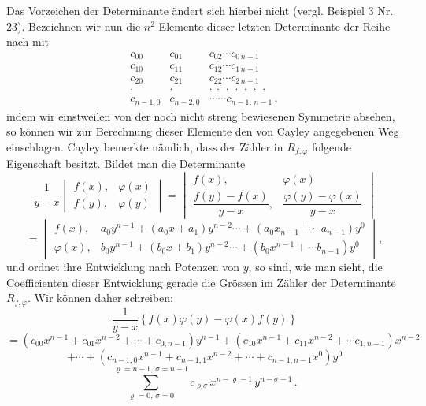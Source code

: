 \documentclass[11pt]{article}
\providecommand{\weq}[2]{\begin{equation}\tag{#1}#2\end{equation}}
\begin{document}
Das Vorzeichen der Determinante \"andert sich hierbei nicht (vergl.
Beispiel 3 Nr. 23). Bezeichnen wir nun die $n^2$ Elemente dieser letzten
Determinante der Reihe nach mit
\[
\begin{matrix}
c_{00} & c_{01} & c_{02} \cdots c_{0\,n-1} \\
c_{10} & c_{11} & c_{12} \cdots c_{1\,n-1} \\
c_{20} & c_{21} & c_{22} \cdots c_{2\,n-1} \\
\cdot & \cdot & \cdot\ \cdot\ \cdot\ \cdot\ \cdot\ \cdot\ \cdot \\
c_{n-1,0} & c_{n-2,0} & \cdots\cdots c_{n-1,\,n-1}\,,
\end{matrix}
\]
indem wir einstweilen von der noch nicht streng bewiesenen Symmetrie
absehen, so k\"onnen wir zur Berechnung dieser Elemente den von Cayley
angegebenen Weg einschlagen. Cayley bemerkte n\"amlich, dass der Z\"ahler
in $R_{f,\varphi}$ folgende Eigenschaft besitzt. Bildet man die
Determinante
\[
\frac{1}{y-x}
\begin{vmatrix} f(x), & \varphi(x) \\ f(y), & \varphi(y) \end{vmatrix}
=
\begin{vmatrix} f(x), & \varphi(x) \\[4pt]
\dfrac{f(y)-f(x)}{y-x}, & \dfrac{\varphi(y)-\varphi(x)}{y-x} \end{vmatrix}
\]
\[
=
\begin{vmatrix}
f(x), & a_0 y^{n-1} + (a_0 x + a_1) y^{n-2} \cdots + (a_0 x_{n-1} + \cdots a_{n-1}) y^0 \\
\varphi(x), & b_0 y^{n-1} + (b_0 x + b_1) y^{n-2} \cdots + (b_0 x^{n-1} + \cdots b_{n-1}) y^0
\end{vmatrix},
\]
und ordnet ihre Entwicklung nach Potenzen von $y$, so sind, wie man
sieht, die Coefficienten dieser Entwicklung gerade die Gr\"ossen im
Z\"ahler der Determinante $R_{f,\varphi}$. Wir k\"onnen daher schreiben:
\[
\frac{1}{y-x}\left\{f(x)\varphi(y) - \varphi(x)f(y)\right\}
\]
\[
= (c_{00}x^{n-1}+c_{01}x^{n-2}+\cdots+c_{0,n-1})y^{n-1}+(c_{10}x^{n-1}+c_{11}x^{n-2}+\cdots c_{1,n-1})x^{n-2}
\]
\[
+ \cdots + (c_{n-1,0}x^{n-1} + c_{n-1,1}x^{n-2} + \cdots + c_{n-1,n-1}x^0)y^0
\]
\weq{I}{
\sum_{\varrho=0,\,\sigma=0}^{\varrho=n-1,\,\sigma=n-1} c_{\varrho\sigma}\, x^{n-\varrho-1}\, y^{n-\sigma-1}\,.
}
\end{document}
